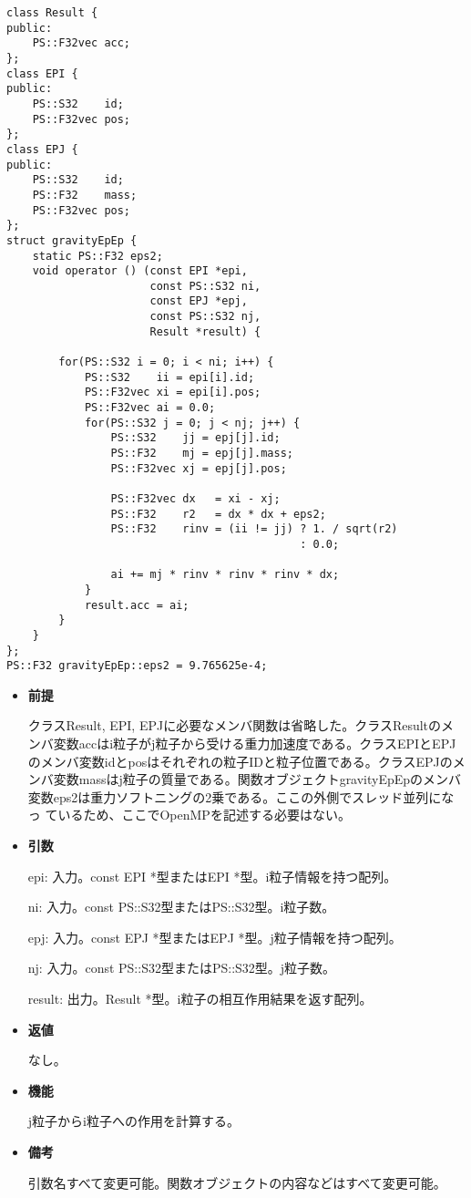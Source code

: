 \begin{lstlisting}[caption=calcForceEpEp]
class Result {
public:
    PS::F32vec acc;
};
class EPI {
public:
    PS::S32    id;
    PS::F32vec pos;
};
class EPJ {
public:
    PS::S32    id;
    PS::F32    mass;
    PS::F32vec pos;
};
struct gravityEpEp {
    static PS::F32 eps2;
    void operator () (const EPI *epi,
                      const PS::S32 ni,
                      const EPJ *epj,
                      const PS::S32 nj,
                      Result *result) {

        for(PS::S32 i = 0; i < ni; i++) {
            PS::S32    ii = epi[i].id;
            PS::F32vec xi = epi[i].pos;
            PS::F32vec ai = 0.0;
            for(PS::S32 j = 0; j < nj; j++) {
                PS::S32    jj = epj[j].id;
                PS::F32    mj = epj[j].mass;
                PS::F32vec xj = epj[j].pos;

                PS::F32vec dx   = xi - xj;
                PS::F32    r2   = dx * dx + eps2;
                PS::F32    rinv = (ii != jj) ? 1. / sqrt(r2)
                                             : 0.0;

                ai += mj * rinv * rinv * rinv * dx;
            }
            result.acc = ai;
        }
    }
};
PS::F32 gravityEpEp::eps2 = 9.765625e-4;
\end{lstlisting}

\begin{itemize}

\item {\bf 前提}

  クラスResult, EPI, EPJに必要なメンバ関数は省略した。クラスResultのメ
  ンバ変数accはi粒子がj粒子から受ける重力加速度である。クラスEPIとEPJ
  のメンバ変数idとposはそれぞれの粒子IDと粒子位置である。クラスEPJのメ
  ンバ変数massはj粒子の質量である。関数オブジェクトgravityEpEpのメンバ
  変数eps2は重力ソフトニングの2乗である。ここの外側でスレッド並列になっ
  ているため、ここでOpenMPを記述する必要はない。

\item {\bf 引数}

  epi: 入力。const EPI *型またはEPI *型。i粒子情報を持つ配列。

  ni: 入力。const PS::S32型またはPS::S32型。i粒子数。

  epj: 入力。const EPJ *型またはEPJ *型。j粒子情報を持つ配列。
  
  nj: 入力。const PS::S32型またはPS::S32型。j粒子数。

  result: 出力。Result *型。i粒子の相互作用結果を返す配列。

\item {\bf 返値}

  なし。
  
\item {\bf 機能}

  j粒子からi粒子への作用を計算する。
  
\item {\bf 備考}

  引数名すべて変更可能。関数オブジェクトの内容などはすべて変更可能。
  
\end{itemize}

